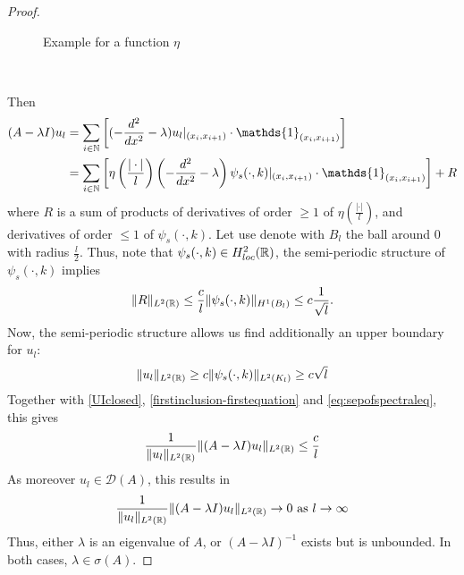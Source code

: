 \begin{theorem}
\begin{proof}
\begin{figure}[!ht] \centering
	\caption{Example for a function $\eta$} %
\end{figure}
~\newline		
		
	 	Then
		\begin{align}
			(A - \lambda I) u_{l} & = \sum_{i \in \N} \left[ (- \frac{d^{2}}{dx^{2}} - \lambda) u_{l}|_{(x_{i}, x_{i+1})} \cdot \mathds{1}_{(x_{i}, x_{i+1})} \right] \label{eq:sepofspectraleq} \\
				& = \sum_{i \in \N} \left[ \eta\left(\frac{|\cdot|}{l}\right) \left(- \frac{d^{2}}{dx^{2}} - \lambda \right) \psi_{s}(\cdot, k) |_{(x_{i}, x_{i+1})} \cdot \mathds{1}_{(x_{i}, x_{i+1})} \right] + R \notag
		\end{align}
		where $R$ is a sum of products of derivatives of order $\geq 1$ of $\eta\left(\frac{|\cdot|}{l}\right)$, and derivatives of order $\leq 1$ of $\psi_{s}(\cdot, k)$. Let use denote with $B_{l}$ the ball around $0$ with radius $\frac{l}{2}$. Thus, note that $\psi_{s}(\cdot, k) \in H^{2}_{loc}(\mathbb{R})$, the semi-periodic structure of $\psi_{s}(\cdot, k)$ implies %
		\begin{equation}
			 \| R \|_{L^{2}(\mathbb{R})} \leq \frac{c}{l} \| \psi_{s}(\cdot, k) \|_{H^{1}(B_{l})} \leq c \frac{1}{\sqrt{l}}. \label{eq:estimofR}
		\end{equation}
		Now, the semi-periodic structure allows us find additionally an upper boundary for $u_{l}$:
		\[ \| u_{l} \|_{L^{2}(\mathbb{R})} \geq c \| \psi_{s}(\cdot, k) \|_{L^{2}(K_{l})} \geq c \sqrt{l} \]
		Together with \eqref{UIclosed}, \eqref{firstinclusion-firstequation} and \eqref{eq:sepofspectraleq}, this gives
		\[ \frac{1}{\|u_{l}\|_{L^{2}(\mathbb{R})}}\| (A - \lambda I) u_{l} \|_{L^{2}(\mathbb{R})} \leq \frac{c}{l} \]
		As moreover $u_{l} \in \mathcal{D}(A)$, this results in
			\[ \frac{1}{\|u_{l} \|_{L^{2}(\mathbb{R})}} \| (A - \lambda I) u_{l} \|_{L^{2}(\mathbb{R})} \rightarrow 0 \text{ as } l \rightarrow \infty \]
		Thus, either $\lambda$ is an eigenvalue of $A$, or $(A - \lambda I)^{-1}$ exists but is unbounded. In both cases, $\lambda \in \sigma(A)$.
	\end{proof}
\end{theorem}	

